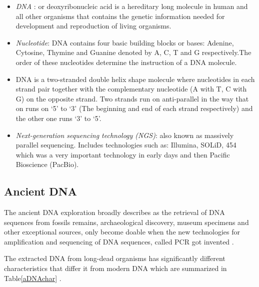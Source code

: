 \documentclass[11pt,a4paper]{report}
\begin{document}
\begin{itemize} 
	\item  \emph{DNA }: or deoxyribonucleic acid is a hereditary long molecule in human and all other organisms that contains the genetic information needed for development and reproduction of living organisms.
	
	
	\item \emph{Nucleotide}: DNA contains four basic building blocks or bases: Adenine, Cytosine, Thymine and Guanine denoted by A, C, T and G respectively.The order of these nucleotides determine the instruction of a DNA molecule.
	
	\item DNA is a two-stranded double helix shape molecule where nucleotides in each strand pair together with the complementary nucleotide (A with T, C with G) on the opposite strand. Two strands run on anti-parallel in the way that on runs on \enquote*{5} to \enquote*{3} (The beginning and end of each strand respectively) and the other one runs \enquote*{3} to \enquote*{5}.
	
	\item \emph{Next-generation sequencing technology (NGS)}: also known as massively parallel sequencing.
	Includes technologies such as: Illumina, SOLiD, 454 which was a very important technology in early days and then Pacific Bioscience (PacBio).
	
	
\end{itemize}

\subsection{Ancient DNA } \label{Ancient DNA }
The ancient DNA exploration broadly describes as the retrieval of DNA sequences from fossils remains, archaeological discovery, museum specimens and other exceptional sources, only become doable when the new technologies for amplification and sequencing of DNA sequences, called PCR got invented \cite{paabo2004genetic}.

The extracted DNA from long-dead organisms has significantly different characteristics that differ it from modern DNA which are summarized in Table\ref{aDNAchar} .\\
\end{document}

